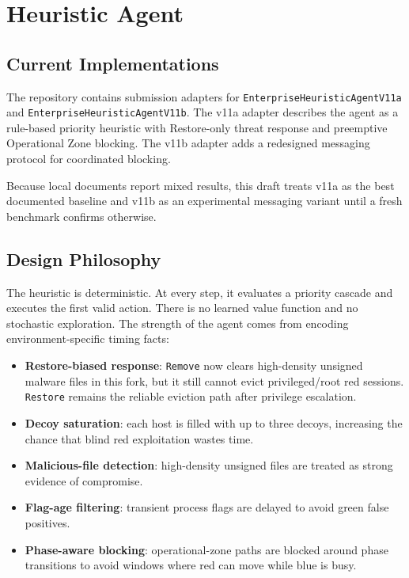 \section{Heuristic Agent}

\subsection{Current Implementations}

The repository contains submission adapters for \texttt{EnterpriseHeuristicAgentV11a} and \texttt{EnterpriseHeuristicAgentV11b}. The v11a adapter describes the agent as a rule-based priority heuristic with Restore-only threat response and preemptive Operational Zone blocking. The v11b adapter adds a redesigned messaging protocol for coordinated blocking.

Because local documents report mixed results, this draft treats v11a as the best documented baseline and v11b as an experimental messaging variant until a fresh benchmark confirms otherwise.

\subsection{Design Philosophy}

The heuristic is deterministic. At every step, it evaluates a priority cascade and executes the first valid action. There is no learned value function and no stochastic exploration. The strength of the agent comes from encoding environment-specific timing facts:

\begin{itemize}
  \item \textbf{Restore-biased response}: \texttt{Remove} now clears high-density unsigned malware files in this fork, but it still cannot evict privileged/root red sessions. \texttt{Restore} remains the reliable eviction path after privilege escalation.
  \item \textbf{Decoy saturation}: each host is filled with up to three decoys, increasing the chance that blind red exploitation wastes time.
  \item \textbf{Malicious-file detection}: high-density unsigned files are treated as strong evidence of compromise.
  \item \textbf{Flag-age filtering}: transient process flags are delayed to avoid green false positives.
  \item \textbf{Phase-aware blocking}: operational-zone paths are blocked around phase transitions to avoid windows where red can move while blue is busy.
\end{itemize}

